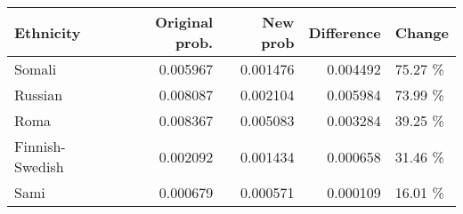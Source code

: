 \begin{tabular}{lrrrl}
\toprule
      Ethnicity &  Original prob. &  New prob &  Difference &  Change \\
\midrule
         Somali &        0.005967 &  0.001476 &    0.004492 & 75.27 \% \\
        Russian &        0.008087 &  0.002104 &    0.005984 & 73.99 \% \\
           Roma &        0.008367 &  0.005083 &    0.003284 & 39.25 \% \\
Finnish-Swedish &        0.002092 &  0.001434 &    0.000658 & 31.46 \% \\
           Sami &        0.000679 &  0.000571 &    0.000109 & 16.01 \% \\
\bottomrule
\end{tabular}
